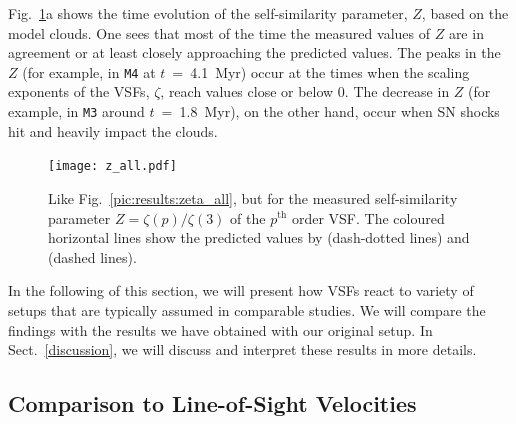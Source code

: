 Fig.~\ref{pic:results:z_all}a shows the time evolution of the self-similarity parameter, $Z$, based on the model clouds. 
One sees that most of the time the measured values of $Z$ are in agreement or at least closely approaching the predicted values.
The peaks in the $Z$ (for example, in \texttt{M4} at $t$~=~4.1~Myr) occur at the times when the scaling exponents of the VSFs, $\zeta$, reach values close or below 0.
The decrease in $Z$ (for example, in \texttt{M3} around $t$~=~1.8~Myr), on the other hand, occur when SN shocks hit and heavily impact the clouds. 

\begin{figure}[!htb]
	\centering
	\texttt{[image: z\_all.pdf]}
	\caption{ Like Fig.~\ref{pic:results:zeta_all}, but for the measured self-similarity parameter $Z = \zeta(p) / \zeta(3)$ of the $p^\mathrm{th}$ order VSF. The coloured horizontal lines show the predicted values by \citet{She1994} (dash-dotted lines) and \citet{Boldyrev2002} (dashed lines).
	}
	\label{pic:results:z_all}
\end{figure}

In the following of this section, we will present how VSFs react to variety of setups that are typically assumed in comparable studies.
We will compare the findings with the results we have obtained with our original setup.
In Sect.~\ref{discussion}, we will discuss and interpret these results in more details.


\subsection{Comparison to Line-of-Sight Velocities}\label{results:1d}

